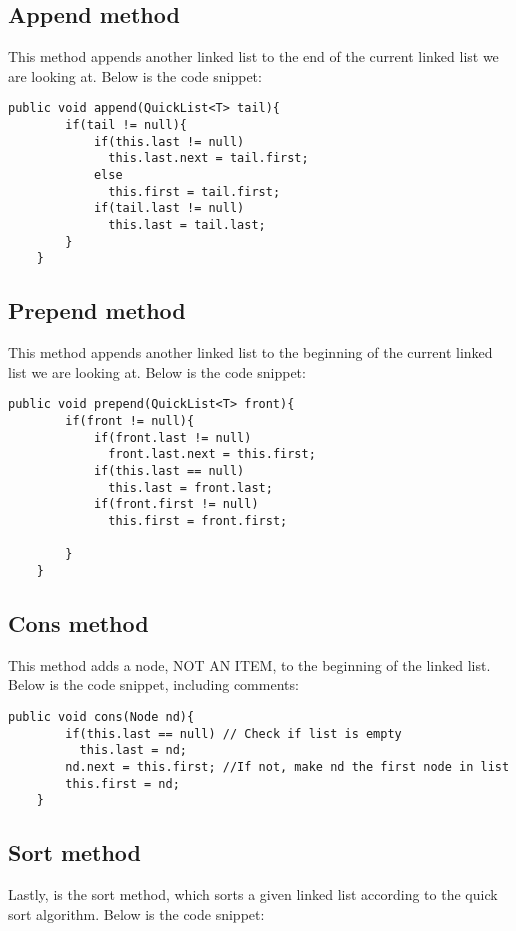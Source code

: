 \documentclass[a4paper,11pt]{article}
\begin{document}
\subsection*{ Append method}
This method appends another linked list to the end of the current linked list we are looking at. Below is the code snippet: 

\begin{verbatim}
public void append(QuickList<T> tail){
        if(tail != null){
            if(this.last != null)
              this.last.next = tail.first;
            else
              this.first = tail.first;
            if(tail.last != null)
              this.last = tail.last;
        }
    }
\end{verbatim}


\subsection*{Prepend method}
This method appends another linked list to the beginning of the current linked list we are looking at. Below is the code snippet:

\begin{verbatim}
public void prepend(QuickList<T> front){
        if(front != null){
            if(front.last != null)
              front.last.next = this.first;
            if(this.last == null)
              this.last = front.last;
            if(front.first != null)
              this.first = front.first;

        }
    }
\end{verbatim}



\subsection*{Cons method}
This method adds a node, NOT AN ITEM, to the beginning of the linked list. Below is the code snippet, including comments:

\begin{verbatim}
public void cons(Node nd){
        if(this.last == null) // Check if list is empty
          this.last = nd;
        nd.next = this.first; //If not, make nd the first node in list
        this.first = nd;
    }
\end{verbatim}

\subsection*{Sort method}
Lastly, is the sort method, which sorts a given linked list according to the quick sort algorithm. Below is the code snippet:
\end{document}
